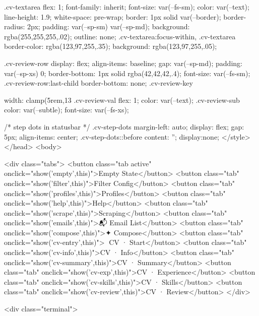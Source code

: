 {{{{{{{{{{{{{.cv-textarea {
  flex: 1; font-family: inherit; font-size: var(--fs-sm);
  color: var(--text); line-height: 1.9; white-space: pre-wrap;
  border: 1px solid var(--border); border-radius: 2px;
  padding: var(--sp-sm) var(--sp-md);
  background: rgba(255,255,255,.02); outline: none;
}
.cv-textarea:focus-within, .cv-textarea { border-color: rgba(123,97,255,.35); background: rgba(123,97,255,.05); }

.cv-review-row {
  display: flex; align-items: baseline; gap: var(--sp-md);
  padding: var(--sp-xs) 0; border-bottom: 1px solid rgba(42,42,42,.4);
  font-size: var(--fs-sm);
}
.cv-review-row:last-child { border-bottom: none; }
.cv-review-key { width: clamp(5rem,13%
.cv-review-val { flex: 1; color: var(--text); }
.cv-review-sub { color: var(--subtle); font-size: var(--fs-xs); }

/* step dots in statusbar */
.cv-step-dots { margin-left: auto; display: flex; gap: 5px; align-items: center; }
.cv-step-dots::before { content: ''; display:none; }
</style>
</head>
<body>

<div class="tabs">
  <button class="tab active" onclick="show('empty',this)">Empty State</button>
  <button class="tab" onclick="show('filter',this)">Filter Config</button>
  <button class="tab" onclick="show('profiles',this)">Profiles</button>
  <button class="tab" onclick="show('help',this)">Help</button>
  <button class="tab" onclick="show('scrape',this)">Scraping</button>
  <button class="tab" onclick="show('emails',this)">📬 Email List</button>
  <button class="tab" onclick="show('compose',this)">✦ Compose</button>
  <button class="tab" onclick="show('cv-entry',this)">📄 CV · Start</button>
  <button class="tab" onclick="show('cv-info',this)">CV · Info</button>
  <button class="tab" onclick="show('cv-summary',this)">CV · Summary</button>
  <button class="tab" onclick="show('cv-exp',this)">CV · Experience</button>
  <button class="tab" onclick="show('cv-skills',this)">CV · Skills</button>
  <button class="tab" onclick="show('cv-review',this)">CV · Review</button>
</div>

<div class="terminal">

}}}}}}}}}}}}}}
